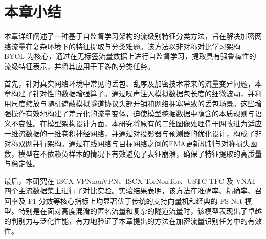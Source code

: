 \section{本章小结}
本章详细阐述了一种基于自监督学习架构的流级别特征分类方法，旨在解决加密网络流量在复杂环境下的特征提取与分类难题。该方法以非对称对比学习架构 BYOL 为核心，通过在无标签流量数据上进行自监督学习，提取具有强鲁棒性的流级特征表示，并将其应用于下游的分类任务。

首先，针对真实网络环境中常见的丢包、乱序及加密技术带来的流量变异问题，本章构建了针对性的数据增强算子。通过噪声注入模拟数据包长度的细微波动，并利用尺度缩放与随机遮蔽模拟隧道协议头部开销和网络拥塞导致的丢包场景。这些增强操作有效地构建了差异化的流量变体，迫使模型挖掘数据中隐含的本质规则与语义不变性。在模型架构设计方面，本研究将原有的二维图像处理骨干网改进为适应一维流数据的一维卷积神经网络，并通过对投影器与预测器的优化设计，构成了非对称双网并行架构。通过在线网络与目标网络之间的EMA更新机制与对称损失函数，模型在不依赖负样本的情况下有效避免了表征崩溃，确保了特征提取的高质量与稳定性。

最后，本研究在 ISCX-VPNnonVPN、ISCX-TorNonTor、USTC-TFC 及 VNAT 四个主流数据集上进行了对比实验。实验结果表明，该方法在准确率、精确率、召回率及 F1 分数等核心指标上均显著优于传统的支持向量机和经典的 FS-Net 模型。特别是在面对高度混淆的匿名流量和复杂的隧道流量时，该模型表现出了卓越的判别力与泛化性能，有力地验证了本章提出的方法在加密流量识别任务中的有效性。

